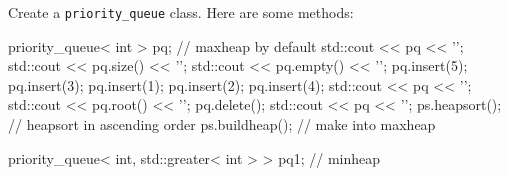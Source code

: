   Create a \verb!priority_queue! class.
  Here are some methods:
  \begin{console}
priority_queue< int > pq; // maxheap by default
std::cout << pq << '\n';
std::cout << pq.size() << '\n';
std::cout << pq.empty() << '\n';
pq.insert(5);
pq.insert(3);
pq.insert(1);
pq.insert(2);
pq.insert(4);
std::cout << pq << '\n';
std::cout << pq.root() << '\n';
pq.delete();
std::cout << pq << '\n';
ps.heapsort();  // heapsort in ascending order
ps.buildheap(); // make into maxheap

priority_queue< int, std::greater< int > > pq1; // minheap
  \end{console}
